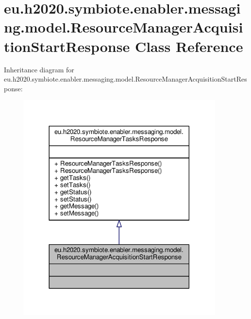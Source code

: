 \hypertarget{classeu_1_1h2020_1_1symbiote_1_1enabler_1_1messaging_1_1model_1_1ResourceManagerAcquisitionStartResponse}{}\section{eu.\+h2020.\+symbiote.\+enabler.\+messaging.\+model.\+Resource\+Manager\+Acquisition\+Start\+Response Class Reference}
\label{classeu_1_1h2020_1_1symbiote_1_1enabler_1_1messaging_1_1model_1_1ResourceManagerAcquisitionStartResponse}


Inheritance diagram for eu.\+h2020.\+symbiote.\+enabler.\+messaging.\+model.\+Resource\+Manager\+Acquisition\+Start\+Response\+:\nopagebreak
\begin{figure}[H]
\begin{center}
\leavevmode
\includegraphics[width=296pt]{classeu_1_1h2020_1_1symbiote_1_1enabler_1_1messaging_1_1model_1_1ResourceManagerAcquisitionStartResponse__inherit__graph}
\end{center}
\end{figure}


